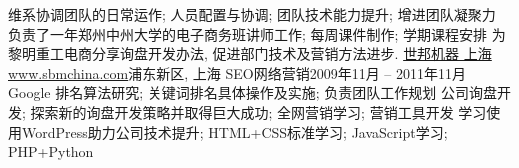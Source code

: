           {维系协调团队的日常运作; 人员配置与协调; 团队技术能力提升; 增进团队凝聚力}
          {负责了一年郑州中州大学的电子商务班讲师工作; 每周课件制作; 学期课程安排}
          {为黎明重工电商分享询盘开发办法, 促进部门技术及营销方法进步.}
      \resumeItemListEnd
    \resumeSubheading
      {\href{http://www.shibangchina.com/}{世邦机器 上海 www.sbmchina.com}}{浦东新区, 上海}
      {SEO网络营销}{2009年11月 -- 2011年11月}
      \resumeItemListStart
          {Google 排名算法研究; 关键词排名具体操作及实施; 负责团队工作规划}
          {公司询盘开发; 探索新的询盘开发策略并取得巨大成功; 全网营销学习; 营销工具开发}
          {学习使用WordPress助力公司技术提升; HTML+CSS标准学习; JavaScript学习; PHP+Python}
      \resumeItemListEnd
  \resumeSubHeadingListEnd
